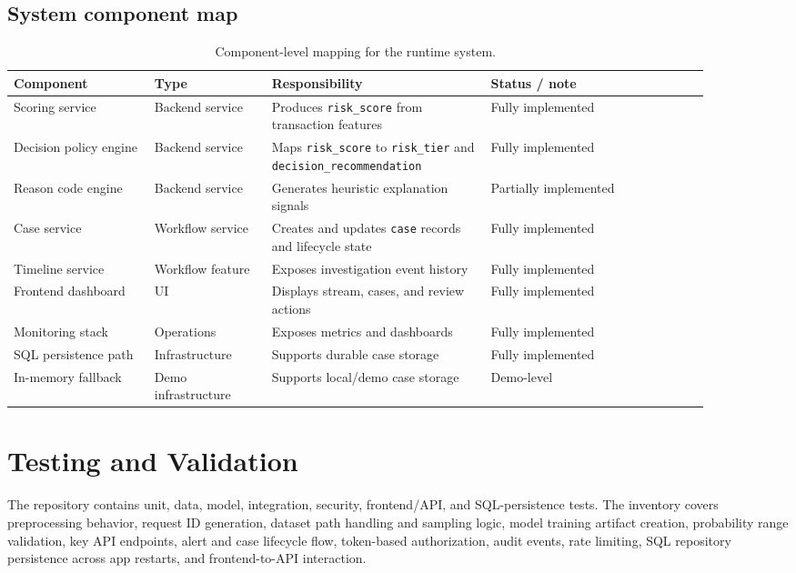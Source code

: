 \documentclass[11pt]{article}
\newcommand{\code}[1]{\texttt{#1}}
\begin{document}
\subsection{System component map}
\begin{table}[H]
\centering
\begin{tabular}{p{0.18\linewidth}p{0.15\linewidth}p{0.28\linewidth}p{0.28\linewidth}}
\toprule
Component & Type & Responsibility & Status / note \\
\midrule
Scoring service & Backend service & Produces \code{risk\_score} from transaction features & Fully implemented \\
Decision policy engine & Backend service & Maps \code{risk\_score} to \code{risk\_tier} and \code{decision\_recommendation} & Fully implemented \\
Reason code engine & Backend service & Generates heuristic explanation signals & Partially implemented \\
Case service & Workflow service & Creates and updates \code{case} records and lifecycle state & Fully implemented \\
Timeline service & Workflow feature & Exposes investigation event history & Fully implemented \\
Frontend dashboard & UI & Displays stream, cases, and review actions & Fully implemented \\
Monitoring stack & Operations & Exposes metrics and dashboards & Fully implemented \\
SQL persistence path & Infrastructure & Supports durable case storage & Fully implemented \\
In-memory fallback & Demo infrastructure & Supports local/demo case storage & Demo-level \\
\bottomrule
\end{tabular}
\caption{Component-level mapping for the runtime system.}
\end{table}

\section{Testing and Validation}
The repository contains unit, data, model, integration, security, frontend/API, and SQL-persistence tests. The inventory covers preprocessing behavior, request ID generation, dataset path handling and sampling logic, model training artifact creation, probability range validation, key API endpoints, alert and case lifecycle flow, token-based authorization, audit events, rate limiting, SQL repository persistence across app restarts, and frontend-to-API interaction.
\end{document}
